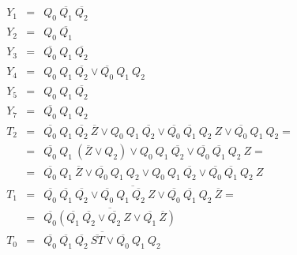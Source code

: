 \documentclass[a4paper, 10pt]{article}
\begin{document}
\begin{eqnarray*}
Y_1&=&Q_0\ \overline{Q_1}\ \overline{Q_2}\\
Y_2&=&Q_0\ \overline{Q_1}\\
Y_3&=&\overline{Q_0}\ Q_1\ \overline{Q_2}\\
Y_4&=&Q_0\ Q_1\ \overline{Q_2} \vee \overline{Q_0}\ Q_1\ Q_2\\
Y_5&=&Q_0\ Q_1\ \overline{Q_2}\\
Y_7&=&\overline{Q_0}\ Q_1\ Q_2\\
T_2&=&\overline{Q_0}\ Q_1\ \overline{Q_2}\ \overline{Z} \vee Q_0\ Q_1\ \overline{Q_2} \vee \overline{Q_0}\ \overline{Q_1}\ Q_2\ Z \vee \overline{Q_0}\ Q_1\ Q_2 =\\
   &=&\overline{Q_0}\ Q_1\ (\overline{Z} \vee Q_2) \vee Q_0\ Q_1\ \overline{Q_2} \vee \overline{Q_0}\ \overline{Q_1}\ Q_2\ Z=\\
   &=&\overline{Q_0}\ Q_1\ \overline{Z} \vee \overline{Q_0}\ Q_1\ Q_2 \vee Q_0\ Q_1\ \overline{Q_2} \vee \overline{Q_0}\ \overline{Q_1}\ Q_2\ Z\\
T_1&=&\overline{\overline{Q_0}\ \overline{Q_1}\ \overline{Q_2} \vee \overline{Q_0}\ Q_1\ \overline{Q_2}\ Z \vee \overline{Q_0}\ \overline{Q_1}\ Q_2\ \overline{Z}} =\\
   &=&\overline{\overline{Q_0} (\overline{Q_1}\ \overline{Q_2} \vee \overline{Q_2}\ Z \vee \overline{Q_1}\ \overline{Z})}\\
T_0&=&\overline{\overline{Q_0}\ \overline{Q_1}\ \overline{Q_2}\ \overline{ST} \vee \overline{Q_0}\ Q_1\ Q_2}\\
\end{eqnarray*}
\end{document}
